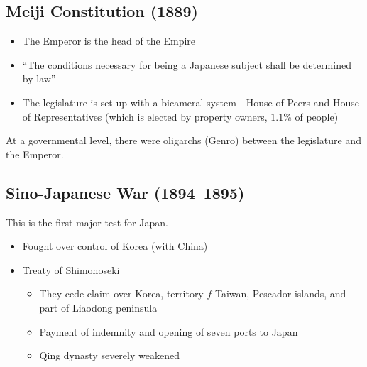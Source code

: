 \documentclass[class=article, crop=false]{standalone}
\begin{document}
  \subsection{Meiji Constitution (1889)}
  \begin{itemize}
    \item The Emperor is the head of the Empire
    \item ``The conditions necessary for being a Japanese subject shall be determined by law''
    \item The legislature is set up with a bicameral system---House of Peers and House of Representatives (which is elected by property owners, $1.1$\% of people)
  \end{itemize}
  At a governmental level, there were oligarchs (Genr\=o) between the legislature and the Emperor.
  \subsection{Sino-Japanese War (1894--1895)}
  This is the first major test for Japan.
  \begin{itemize}
    \item Fought over control of Korea (with China)
    \item Treaty of Shimonoseki
    \begin{itemize}
      \item They cede claim over Korea, territory $f$ Taiwan, Pescador islands, and part of Liaodong peninsula
      \item Payment of indemnity and opening of seven ports to Japan
      \item Qing dynasty severely weakened
    \end{itemize}
  \end{itemize}
\end{document}
